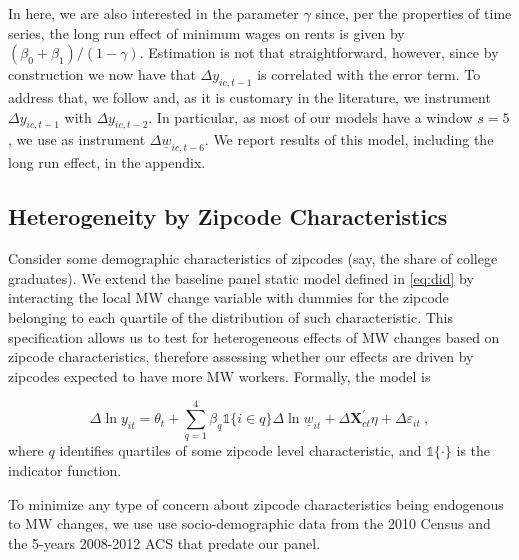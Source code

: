 In here, we are also interested in the parameter $\gamma$ since, per the properties of time
series, the long run effect of minimum wages on rents is given by 
$(\beta_0 + \beta_1)/(1-\gamma)$. %
Estimation is not that straightforward, however, since by construction we now have that 
$\Delta y_{ic,t-1}$ is correlated with the error term. To address that,  we follow 
\textcite{ArellanoBond1991} %
and, as it is customary in the literature, we instrument $\Delta y_{ic,t-1}$ with $\Delta 
y_{ic,t-2}$. In particular, as most of our models have a window $s=5$, we use as instrument 
$\Delta \underline{w}_{ic,t-6}$. We report results of this model, including the long run
effect, in the appendix.

\subsection{Heterogeneity by Zipcode Characteristics}\label{sec:strategy_heterogeneity}

Consider some demographic characteristics of zipcodes (say, the share of college graduates).
We extend the baseline panel static model defined in \autoref{eq:did} by interacting the 
local MW change variable with dummies for the zipcode belonging to each quartile of the 
distribution of such characteristic. This specification allows us to test for heterogeneous effects of MW 
changes based on zipcode characteristics, therefore assessing whether our effects are driven 
by zipcodes expected to have more MW workers. Formally, the model is

\begin{equation}\label{eq:diff_main_hetero} 
    \Delta \ln y_{it} = \theta_t 
    				+ \sum_{q = 1}^4 \beta_q \mathds{1}\{i \in q\} \Delta \ln \underline{w}_{it}
    				+ \Delta \mathbf{X}^{'}_{ct}\eta
    				+ \Delta \varepsilon_{it} \ ,
\end{equation}
where $q$ identifies quartiles of some zipcode level characteristic, and $\mathds{1}\{ \cdot \}$ 
is the indicator function.

To minimize any type of concern about zipcode characteristics being endogenous to MW changes, 
we use use socio-demographic data from the 2010 Census and the 5-years 2008-2012 ACS that 
predate our panel.


